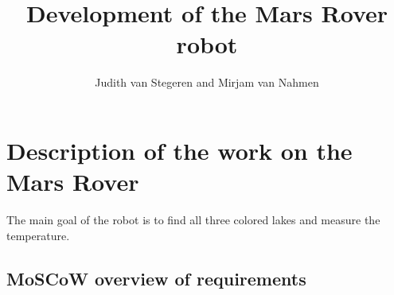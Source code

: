 \documentclass[10pt,a4paper]{article}
\author{Judith van Stegeren and Mirjam van Nahmen}
\title{Development of the Mars Rover robot}
\begin{document}
\maketitle

 
\section*{Description of the work on the Mars Rover}
The main goal of the robot is to find all three colored lakes and measure the temperature.

\subsection*{MoSCoW overview of requirements}
\end{document}
